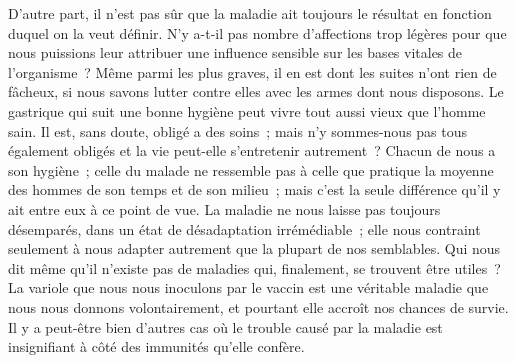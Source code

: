 \documentclass[french,twoside]{book} %
\begin{document}
D’autre part, il n’est pas sûr que la maladie ait toujours le résultat en fonction duquel on la veut définir. N’y a-t-il pas nombre d’affections trop légères pour que nous puissions leur attribuer une influence sensible sur les bases vitales de l’organisme ? Même parmi les plus graves, il en est dont les suites n’ont rien de fâcheux, si nous savons lutter contre elles avec les armes dont nous disposons. Le gastrique qui suit une bonne hygiène peut vivre tout aussi vieux que l’homme sain. Il est, sans doute, obligé a des soins ; mais n’y sommes-nous pas tous également obligés et la vie peut-elle s’entretenir autrement ? Chacun de nous a son hygiène ; celle du malade ne ressemble pas à celle que pratique la moyenne des hommes de son temps et de son milieu ; mais c’est la seule différence qu’il y ait entre eux à ce point de vue. La maladie ne nous laisse pas toujours désemparés, dans un état de désadaptation irrémédiable ; elle nous contraint seulement à nous adapter autrement que la plupart de nos semblables. Qui nous dit même qu’il n’existe pas de maladies qui, finalement, se trouvent être utiles ? La variole que nous nous inoculons par le vaccin est une véritable maladie que nous nous donnons volontairement, et pourtant elle accroît nos chances de survie. Il y a peut-être bien d’autres cas où le trouble causé par la maladie est insignifiant à côté des immunités qu’elle confère.\par
\end{document}
